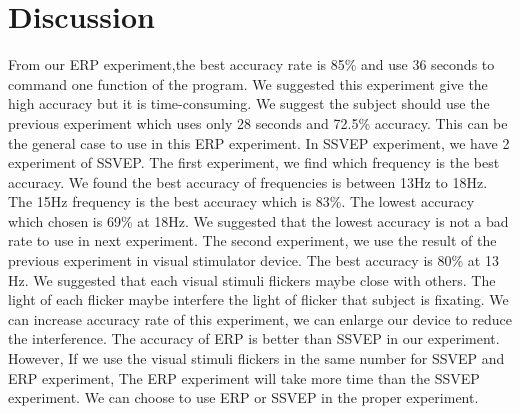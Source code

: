 \section{Discussion}
\hspace{1.5cm} From our ERP experiment,the best accuracy rate is 85\% and use 36 seconds to command one function of the program. We suggested this experiment give the high accuracy but it is time-consuming. We suggest the subject should use the previous experiment which uses only 28 seconds and 72.5\% accuracy. This can be the general case to use in this ERP experiment.
In SSVEP experiment, we have 2 experiment of SSVEP. The first experiment, we find which frequency is the best accuracy. We found the best accuracy of frequencies is between 13Hz to  18Hz. The 15Hz frequency is the best accuracy which is 83\%. The lowest accuracy which chosen is 69\% at 18Hz. We suggested that the lowest accuracy is not a bad rate  to use in next experiment. The second experiment, we use the result of the previous experiment in visual stimulator device. The best accuracy is 80\% at 13 Hz. We suggested that each visual stimuli flickers maybe close with others. The light of each flicker maybe interfere the light of flicker that subject is fixating. We can increase accuracy rate of this experiment, we can enlarge our device to reduce the interference. The accuracy of ERP is better than SSVEP in our experiment. However, If we use the visual stimuli flickers in the same number for SSVEP and ERP experiment, The ERP experiment will take more time than the SSVEP experiment. We can choose to use ERP or SSVEP in the proper experiment.

